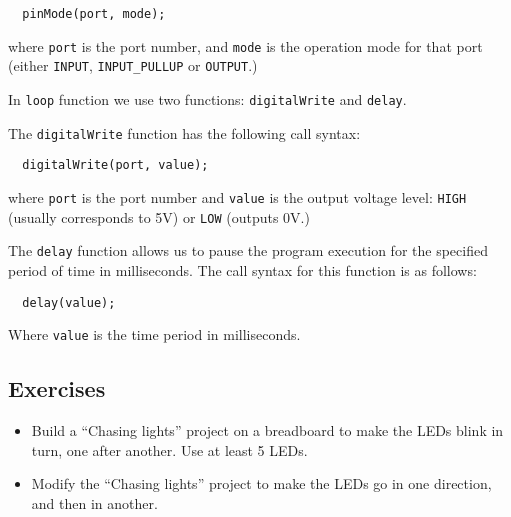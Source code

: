\documentclass[../sparc.tex]{subfiles}
\begin{document}
\begin{verbatim}
  pinMode(port, mode);
\end{verbatim}

where \texttt{port} is the port number, and \texttt{mode} is the operation mode
for that port (either \texttt{INPUT}, \texttt{INPUT\_PULLUP} or
\texttt{OUTPUT}.)

In \texttt{loop} function we use two functions: \texttt{digitalWrite} and
\texttt{delay}.

The \texttt{digitalWrite} function has the following call syntax:

\begin{verbatim}
  digitalWrite(port, value);
\end{verbatim}

where \texttt{port} is the port number and \texttt{value} is the output voltage
level: \texttt{HIGH} (usually corresponds to 5V) or \texttt{LOW} (outputs 0V.)

The \texttt{delay} function allows us to pause the program execution for the
specified period of time in milliseconds.  The call syntax for this function is
as follows:

\begin{verbatim}
  delay(value);
\end{verbatim}

Where \texttt{value} is the time period in milliseconds.

\subsection{Exercises}
\begin{itemize}
\item Build a ``Chasing lights'' project on a breadboard to make the LEDs blink
  in turn, one after another.  Use at least 5 LEDs.
\item Modify the ``Chasing lights'' project to make the LEDs go in one
  direction, and then in another.
\end{itemize}
\end{document}

